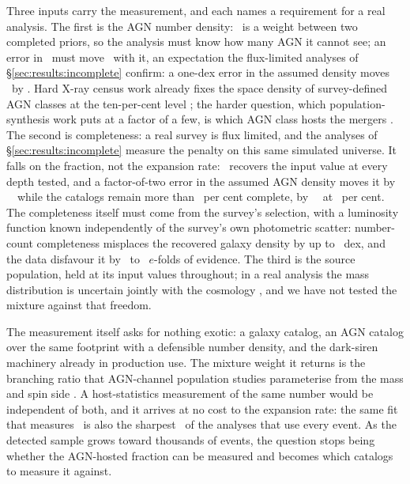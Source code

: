 Three inputs carry the measurement, and each names a requirement for a real
analysis. The first is the AGN number density: \fagn\ is a weight between two
completed priors, so the analysis must know how many AGN it cannot see; an
error in \nzagn\ must move \fagn\ with it, an expectation the flux-limited
analyses of \S\ref{sec:results:incomplete} confirm: a one-dex error in the
assumed density moves \fagn\ by \FagnDensitySlope. Hard X-ray census work
already fixes the space density of survey-defined AGN classes at the
ten-per-cent level \citep{Ananna2022}; the harder question, which
population-synthesis work puts at a factor of a few, is which AGN class hosts
the mergers \citep{McKernan2018, FordMcKernan2022}. The second is
completeness: a real survey is flux limited, and the analyses of
\S\ref{sec:results:incomplete} measure the penalty on this same simulated
universe. It falls on the fraction, not the expansion rate: \Hz\ recovers
the input value at every depth tested, and a factor-of-two error in the
assumed AGN density moves it by \HzDensityShiftFactorTwoDeep~\kmsmpc\ while
the catalogs remain more than \CompMTwenty\ per cent complete, by
\HzDensityShiftFactorTwo~\kmsmpc\ at \CompMEighteen\ per cent. The
completeness itself must come from the survey's selection, with a
luminosity function known independently of the survey's own photometric
scatter: number-count completeness misplaces the recovered galaxy density
by up to \PixelAnchorBiasMaxDex~dex, and the data disfavour it by
\SeedLnBFmin\ to \SeedLnBFmax\ $e$-folds of evidence. The third is the source population, held at its input values
throughout; in a real analysis the mass distribution is uncertain jointly with
the cosmology \citep{GWTC3Cosmo2023}, and we have not tested the mixture
against that freedom.

The measurement itself asks for nothing exotic: a galaxy catalog, an AGN
catalog over the same footprint with a defensible number density, and the
dark-siren machinery already in production use. The mixture weight it returns
is the branching ratio that AGN-channel population studies parameterise from
the mass and spin side \citep{FordMcKernan2022, TagawaHaimanKocsis2020}. A
host-statistics measurement of the same number would be independent of both,
and it arrives at no cost to the expansion rate: the same fit that measures
\fagn\ is also the sharpest \Hz\ of the analyses that use every event. As the detected sample grows toward
thousands of events, the question stops being whether the AGN-hosted fraction
can be measured and becomes which catalogs to measure it against.
